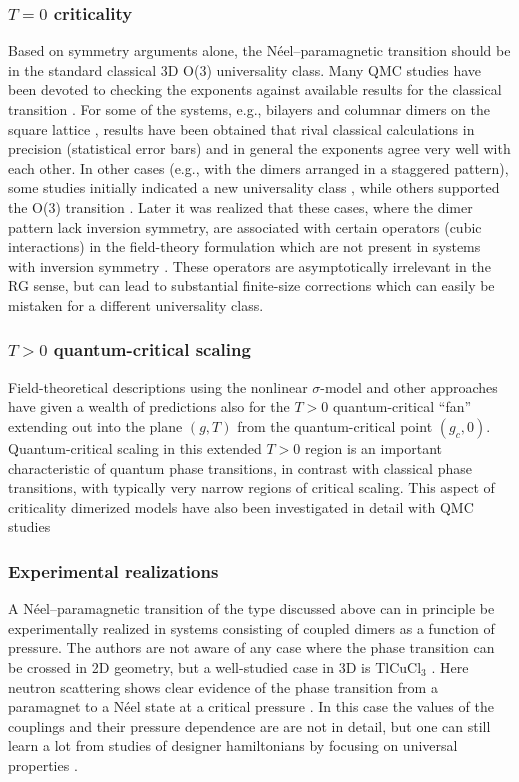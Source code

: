 \documentclass[range]{ar2e}
\begin{document}
\subsubsection{$T=0$ criticality}
Based on symmetry arguments alone, the N\'eel--paramagnetic transition should be in the standard classical 3D O($3$) universality class. Many QMC studies 
have been devoted to checking the exponents against available results for the classical transition \cite{Sandvik94,Troyer96,Matsumoto01,Wang06,Wenzel08,Wenzel09}.
For some of the systems, e.g., bilayers \cite{Wang06} and columnar dimers on the square lattice \cite{Matsumoto01,Wenzel09,Sandvik10b}, results have been 
obtained that rival classical calculations in precision (statistical error bars) and in general the exponents agree very well with each other. In other 
cases (e.g., with the dimers arranged in a staggered pattern), some studies initially indicated a new universality class \cite{Wenzel08}, while others
supported the O($3$) transition \cite{Jiang12}.  Later it was realized that these cases, where the dimer pattern lack inversion symmetry, are associated 
with certain operators (cubic interactions) in the field-theory formulation  which are not present in systems with inversion symmetry \cite{Fritz11}. 
These operators are asymptotically irrelevant in the RG sense, but can lead to substantial finite-size corrections which can easily be mistaken for a 
different universality class.

\subsubsection{$T>0$ quantum-critical scaling}
Field-theoretical descriptions using the nonlinear $\sigma$-model \cite{Haldane83,Chakravarty89,Chubukov94} and other approaches have given a wealth of 
predictions also for the $T>0$ quantum-critical ``fan'' extending out into the plane $(g,T)$  from the quantum-critical point $(g_c,0)$. Quantum-critical
scaling in this extended $T>0$ region is an important characteristic of quantum phase transitions, in contrast with classical phase transitions, with typically 
very narrow regions of critical scaling. This aspect of criticality dimerized models have also been investigated in detail with QMC studies \cite{Sandvik95,Brenig06,Sandvik11a}

\subsubsection{Experimental realizations}
A N\'eel--paramagnetic transition of the type discussed above can in principle be experimentally realized in systems consisting of coupled dimers as a function 
of pressure. The authors are not aware of any case where the phase transition can be crossed in 2D geometry, but a well-studied case in 3D is TlCuCl$_3$ 
\cite{Cavadini01,Ruegg04}. Here neutron scattering shows clear evidence of the phase transition from a paramagnet to a N\'eel state at a critical pressure 
\cite{Ruegg08}. In this case the values of the couplings and their pressure dependence are are not in detail, but one can still learn a lot from studies 
of designer hamiltonians by focusing on universal properties \cite{Troyer97,Jin12,Oitmaa11}.
\end{document}
